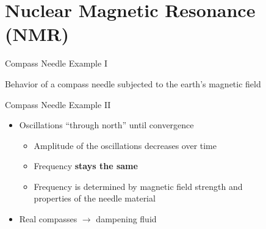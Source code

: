 


\section{Nuclear Magnetic Resonance (NMR)}%
\label{sec:nuclear_magnetic_resonance_nmr}

\begin{frame}{Compass Needle Example I}

Behavior of a compass needle subjected to the earth's magnetic field

\begin{center}
\begingroup
{}%
\only<1>{}%
\only<2>{}%
\only<3>{}%
%
\endgroup
\end{center}

\end{frame}

\begin{frame}{Compass Needle Example II}

    \begin{itemize}
        \item Oscillations ``through north'' until convergence
              \begin{itemize}
                  \item Amplitude of the oscillations decreases over time
                  \item Frequency \textbf{stays the same}
                  \item Frequency is determined by magnetic field strength and \\ properties of the needle material
              \end{itemize}
        \item Real compasses $\rightarrow$ dampening fluid
    \end{itemize}

\end{frame}

